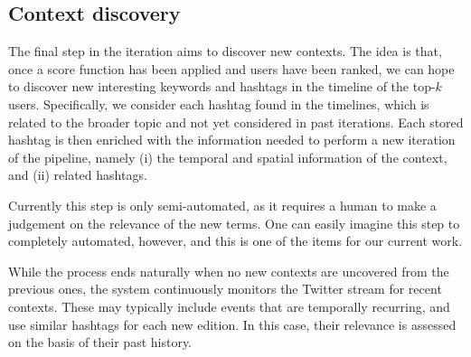 \subsection{Context discovery} \label{sec:context-discovery}

The final step in the iteration aims to discover new contexts. 
The idea is that, once a score function has been applied and users have been ranked, we can hope to discover new interesting keywords and hashtags in the timeline of the top-$k$ users.
Specifically,  we consider each hashtag found in the timelines, which is related to the broader topic and not yet considered in past iterations.
Each stored hashtag is then enriched with the information needed to perform a new iteration of the pipeline, namely (i) the temporal and spatial information of the context, and (ii) related hashtags.

Currently this step is only semi-automated, as it requires a human to make a judgement on the relevance of the new terms. 
One can easily imagine this step to completely automated, however, and this is one of the items for our current work.

While the process ends naturally when no new contexts are uncovered from the previous ones, the system continuously monitors the Twitter stream for recent contexts. These may typically include events that are temporally recurring, and use similar hashtags for each new edition. In this case, their relevance is assessed on the basis of their past history.